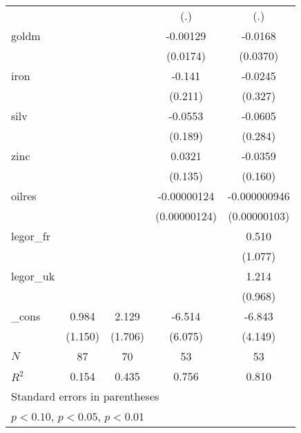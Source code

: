 {\begin{tabular}{l*{4}{c}}
            &                     &                     &         (.)         &         (.)         \\
[1em]
goldm       &                     &                     &    -0.00129         &     -0.0168         \\
            &                     &                     &    (0.0174)         &    (0.0370)         \\
[1em]
iron        &                     &                     &      -0.141         &     -0.0245         \\
            &                     &                     &     (0.211)         &     (0.327)         \\
[1em]
silv        &                     &                     &     -0.0553         &     -0.0605         \\
            &                     &                     &     (0.189)         &     (0.284)         \\
[1em]
zinc        &                     &                     &      0.0321         &     -0.0359         \\
            &                     &                     &     (0.135)         &     (0.160)         \\
[1em]
oilres      &                     &                     & -0.00000124         &-0.000000946         \\
            &                     &                     &(0.00000124)         &(0.00000103)         \\
[1em]
legor\_fr    &                     &                     &                     &       0.510         \\
            &                     &                     &                     &     (1.077)         \\
[1em]
legor\_uk    &                     &                     &                     &       1.214         \\
            &                     &                     &                     &     (0.968)         \\
[1em]
\_cons      &       0.984         &       2.129         &      -6.514         &      -6.843         \\
            &     (1.150)         &     (1.706)         &     (6.075)         &     (4.149)         \\
\hline
\(N\)       &          87         &          70         &          53         &          53         \\
\(R^{2}\)   &       0.154         &       0.435         &       0.756         &       0.810         \\
\hline\hline
\multicolumn{5}{l}{\footnotesize Standard errors in parentheses}\\
\multicolumn{5}{l}{\footnotesize \sym{*} \(p<0.10\), \sym{**} \(p<0.05\), \sym{***} \(p<0.01\)}\\
\end{tabular}
}
